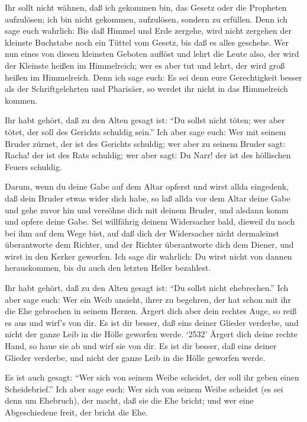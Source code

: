  Ihr sollt nicht wähnen, daß ich gekommen bin, das Gesetz
oder die Propheten aufzulösen; ich bin nicht gekommen, aufzulösen,
sondern zu erfüllen.  Denn ich sage euch wahrlich: Bis daß
Himmel und Erde zergehe, wird nicht zergehen der kleinste Buchstabe noch
ein Tüttel vom Gesetz, bis daß es alles geschehe.  Wer nun
eines von diesen kleinsten Geboten auflöst und lehrt die Leute also, der
wird der Kleinste heißen im Himmelreich; wer es aber tut und lehrt, der
wird groß heißen im Himmelreich.  Denn ich sage euch: Es
sei denn eure Gerechtigkeit besser als der Schriftgelehrten und
Pharisäer, so werdet ihr nicht in das Himmelreich kommen.

 Ihr habt gehört, daß zu den Alten gesagt ist: ``Du sollst
nicht töten; wer aber tötet, der soll des Gerichts schuldig sein.''
 Ich aber sage euch: Wer mit seinem Bruder zürnet, der ist
des Gerichts schuldig; wer aber zu seinem Bruder sagt: Racha! der ist
des Rats schuldig; wer aber sagt: Du Narr! der ist des höllischen Feuers
schuldig.

 Darum, wenn du deine Gabe auf dem Altar opferst und wirst
allda eingedenk, daß dein Bruder etwas wider dich habe,  so
laß allda vor dem Altar deine Gabe und gehe zuvor hin und versöhne dich
mit deinem Bruder, und alsdann komm und opfere deine Gabe. 
Sei willfährig deinem Widersacher bald, dieweil du noch bei ihm auf dem
Wege bist, auf daß dich der Widersacher nicht dermaleinst überantworte
dem Richter, und der Richter überantworte dich dem Diener, und wirst in
den Kerker geworfen.  Ich sage dir wahrlich: Du wirst nicht
von dannen herauskommen, bis du auch den letzten Heller bezahlest.

 Ihr habt gehört, daß zu den Alten gesagt ist: ``Du sollst
nicht ehebrechen.''  Ich aber sage euch: Wer ein Weib
ansieht, ihrer zu begehren, der hat schon mit ihr die Ehe gebrochen in
seinem Herzen.  Ärgert dich aber dein rechtes Auge, so reiß
es aus und wirf's von dir. Es ist dir besser, daß eins deiner Glieder
verderbe, und nicht der ganze Leib in die Hölle geworfen werde.
 `2532' Ärgert dich deine rechte Hand, so haue sie ab und
wirf sie von dir. Es ist dir besser, daß eins deiner Glieder verderbe,
und nicht der ganze Leib in die Hölle geworfen werde.

 Es ist auch gesagt: ``Wer sich von seinem Weibe scheidet,
der soll ihr geben einen Scheidebrief.''  Ich aber sage
euch: Wer sich von seinem Weibe scheidet (es sei denn um Ehebruch), der
macht, daß sie die Ehe bricht; und wer eine Abgeschiedene freit, der
bricht die Ehe.


